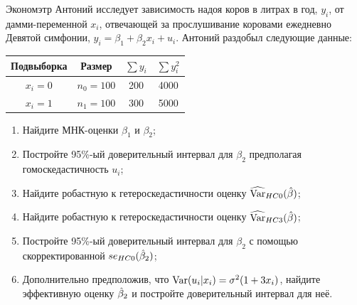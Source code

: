 \begin{problem}
  Экономэтр Антоний исследует зависимость надоя коров в литрах в год, $y_i$, от дамми-переменной $x_i$, отвечающей за прослушивание коровами ежедневно Девятой симфонии, $y_i = \beta_1 + \beta_2 x_i + u_i$. Антоний раздобыл следующие данные:

  \begin{tabular}{cccc}
    \toprule
    Подвыборка & Размер & $\sum y_i$ & $\sum y_i^2$ \\
    \midrule
    $x_i = 0$ & $n_0 = 100$ & 200 & 4000 \\
    $x_i = 1$ & $n_1 = 100$ & 300 & 5000 \\
\bottomrule
  \end{tabular}

  \begin{enumerate}
 \item Найдите МНК-оценки $\beta_1$ и $\beta_2$;
 \item Постройте 95\%-ый доверительный интервал для $\beta_2$ предполагая гомоскедастичность $u_i$;
 \item Найдите робастную к гетероскедастичности оценку $\widehat{\operatorname{Var}}_{HC0}(\hat{\beta})$;
 \item Найдите робастную к гетероскедастичности оценку $\widehat{\operatorname{Var}}_{HC3}(\hat{\beta})$;
 \item Постройте 95\%-ый доверительный интервал для $\beta_2$ с помощью скорректированной $se_{HC0}(\hat{\beta}_2)$;
 \item Дополнительно предположив, что $\operatorname{Var}(u_i |x_i) = \sigma^2(1+3x_i)$, найдите эффективную оценку $\hat{\beta}_2$ и постройте доверительный интервал для неё.
   \end{enumerate}
  \begin{sol}

  \end{sol}
\end{problem}




